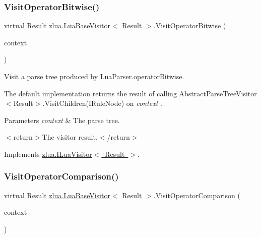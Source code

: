 \subsubsection{\texorpdfstring{Visit\+Operator\+Bitwise()}{VisitOperatorBitwise()}}
{\footnotesize\ttfamily virtual Result \mbox{\hyperlink{classzlua_1_1_lua_base_visitor}{zlua.\+Lua\+Base\+Visitor}}$<$ Result $>$.Visit\+Operator\+Bitwise (\begin{DoxyParamCaption}\item[{\mbox{[}\+Not\+Null\mbox{]} \mbox{\hyperlink{classzlua_1_1_lua_parser_1_1_operator_bitwise_context}{Lua\+Parser.\+Operator\+Bitwise\+Context}}}]{context }\end{DoxyParamCaption})\hspace{0.3cm}{\ttfamily [virtual]}}



Visit a parse tree produced by Lua\+Parser.\+operator\+Bitwise. 

The default implementation returns the result of calling Abstract\+Parse\+Tree\+Visitor$<$\+Result$>$.\+Visit\+Children(\+I\+Rule\+Node) on {\itshape context} . 


\begin{DoxyParams}{Parameters}
{\em context} & The parse tree.\\
\hline
\end{DoxyParams}
$<$return$>$The visitor result.$<$/return$>$ 

Implements \mbox{\hyperlink{interfacezlua_1_1_i_lua_visitor_ac5cb1dcc8f0882eb1c52441549d66026}{zlua.\+I\+Lua\+Visitor$<$ Result $>$}}.

\mbox{\label{classzlua_1_1_lua_base_visitor_a5339d6c6be6a7f222663c1cb2035925e}} 
\subsubsection{\texorpdfstring{Visit\+Operator\+Comparison()}{VisitOperatorComparison()}}
{\footnotesize\ttfamily virtual Result \mbox{\hyperlink{classzlua_1_1_lua_base_visitor}{zlua.\+Lua\+Base\+Visitor}}$<$ Result $>$.Visit\+Operator\+Comparison (\begin{DoxyParamCaption}\item[{\mbox{[}\+Not\+Null\mbox{]} \mbox{\hyperlink{classzlua_1_1_lua_parser_1_1_operator_comparison_context}{Lua\+Parser.\+Operator\+Comparison\+Context}}}]{context }\end{DoxyParamCaption})\hspace{0.3cm}{\ttfamily [virtual]}}



